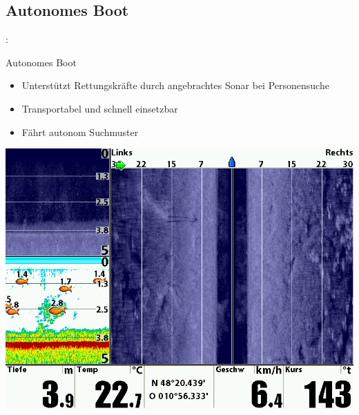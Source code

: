 \documentclass{beamer}
\begin{document}
\subsection{Autonomes Boot}
\begin{frame}{\insertsection: \insertsubsection}
\begin{minipage}{0.45\linewidth}
	Autonomes Boot
	\begin{itemize}
		\item Unterstützt Rettungskräfte durch angebrachtes Sonar bei Personensuche
		\item Transportabel und schnell einsetzbar
		\item Fährt autonom Suchmuster
	\end{itemize}
\end{minipage} \quad
\begin{minipage}{0.45\linewidth}
	\includegraphics[width=\linewidth]{sonar}
\end{minipage}
\end{frame}
\end{document}
